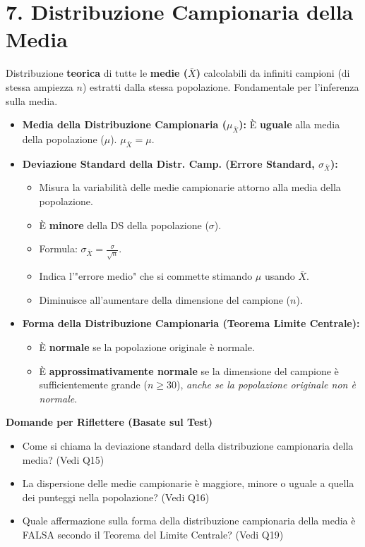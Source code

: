 \documentclass[12pt, a4paper]{article}
\newenvironment{reflectionbox}{%
    \medskip %
    \begin{framed}\par\noindent
    \textbf{\color{boxtitlecolor}Domande per Riflettere (Basate sul Test)} \par
    \begin{itemize}[leftmargin=*, label=$\blacktriangleright$]
}{%
    \end{itemize}\par
    \end{framed}
    \medskip %
}
\newcommand{\popmean}{\mu} %
\newcommand{\samplemean}{\bar{X}} %
\newcommand{\popsd}{\sigma} %
\newcommand{\stderr}{\sigma_{\samplemean}} %
\begin{document}
\section*{7. Distribuzione Campionaria della Media}
Distribuzione \textbf{teorica} di tutte le \textbf{medie ($\samplemean$)} calcolabili da infiniti campioni (di stessa ampiezza $n$) estratti dalla stessa popolazione. Fondamentale per l'inferenza sulla media.
\begin{itemize}
    \item \textbf{Media della Distribuzione Campionaria ($\mu_{\samplemean}$):} È \textbf{uguale} alla media della popolazione ($\popmean$). $\mu_{\samplemean} = \popmean$.
    \item \textbf{Deviazione Standard della Distr. Camp. (Errore Standard, $\stderr$):}
        \begin{itemize}
            \item Misura la variabilità delle medie campionarie attorno alla media della popolazione.
            \item È \textbf{minore} della DS della popolazione ($\popsd$).
            \item Formula: $\stderr = \frac{\popsd}{\sqrt{n}}$.
            \item Indica l'"errore medio" che si commette stimando $\popmean$ usando $\samplemean$.
            \item Diminuisce all'aumentare della dimensione del campione ($n$).
        \end{itemize}
    \item \textbf{Forma della Distribuzione Campionaria (Teorema Limite Centrale):}
        \begin{itemize}
            \item È \textbf{normale} se la popolazione originale è normale.
            \item È \textbf{approssimativamente normale} se la dimensione del campione è sufficientemente grande ($n \ge 30$), \textit{anche se la popolazione originale non è normale}.
        \end{itemize}
\end{itemize}

\begin{reflectionbox}
    \item Come si chiama la deviazione standard della distribuzione campionaria della media? (Vedi Q15)
    \item La dispersione delle medie campionarie è maggiore, minore o uguale a quella dei punteggi nella popolazione? (Vedi Q16)
    \item Quale affermazione sulla forma della distribuzione campionaria della media è FALSA secondo il Teorema del Limite Centrale? (Vedi Q19)
\end{reflectionbox}
\end{document}
